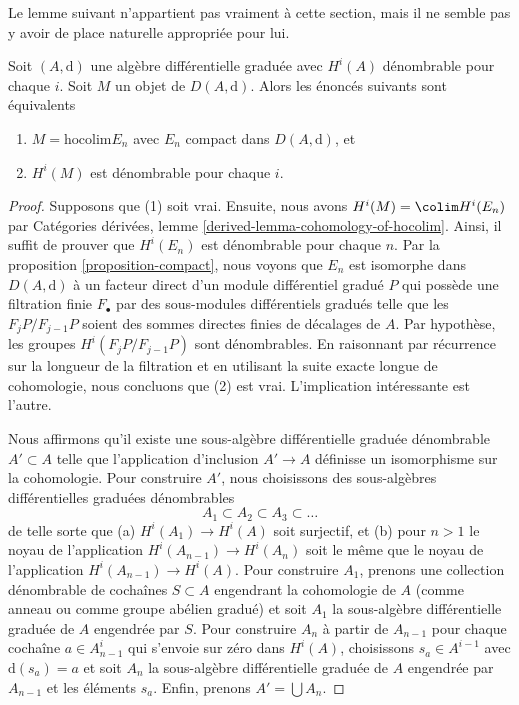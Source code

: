 \noindent
Le lemme suivant n'appartient pas vraiment à cette section, mais il ne
semble pas y avoir de place naturelle appropriée pour lui.

\begin{lemma}
\label{lemma-countable}
Soit $(A, \text{d})$ une algèbre différentielle graduée avec
$H^i(A)$ dénombrable pour chaque $i$. Soit $M$ un objet de $D(A, \text{d})$. Alors
les énoncés suivants sont équivalents
\begin{enumerate}
\item $M = \text{hocolim} E_n$ avec $E_n$ compact dans $D(A, \text{d})$, et
\item $H^i(M)$ est dénombrable pour chaque $i$.
\end{enumerate}
\end{lemma}

\begin{proof}
Supposons que (1) soit vrai. Ensuite, nous avons $H^i(M) = \colim
H^i(E_n)$ par Catégories dérivées, lemme
\ref{derived-lemma-cohomology-of-hocolim}. Ainsi, il suffit de prouver que $H^i(E_n)$ est dénombrable pour chaque $n$.
Par la proposition \ref{proposition-compact}, nous voyons que
$E_n$ est isomorphe dans $D(A, \text{d})$ à un facteur direct d'un
module différentiel gradué $P$ qui possède une filtration finie
$F_\bullet$ par des sous-modules différentiels gradués telle
que les $F_jP/F_{j - 1}P$ soient des sommes directes finies de décalages de $A$.
Par hypothèse, les groupes $H^i(F_jP/F_{j - 1}P)$ sont dénombrables.
En raisonnant par récurrence sur la longueur de la filtration et en
utilisant la suite exacte longue de cohomologie, nous concluons que (2) est
vrai. L'implication intéressante est l'autre.

\medskip\noindent
Nous affirmons qu'il existe une sous-algèbre différentielle
graduée dénombrable $A' \subset A$ telle que l'application d'inclusion
$A' \to A$ définisse un isomorphisme sur la cohomologie. Pour
construire $A'$, nous choisissons des sous-algèbres différentielles graduées
dénombrables
$$
A_1 \subset A_2 \subset A_3 \subset \ldots
$$
de telle sorte que (a) $H^i(A_1) \to H^i(A)$ soit surjectif, et
(b) pour $n > 1$ le noyau de l'application $H^i(A_{n - 1}) \to
H^i(A_n)$ soit le même que le noyau de l'application $H^i(A_{n - 1}) \to
H^i(A)$. Pour construire $A_1$, prenons une collection dénombrable de
cochaînes $S \subset A$ engendrant la cohomologie de $A$ (comme anneau ou
comme groupe abélien gradué) et soit
$A_1$ la sous-algèbre différentielle graduée de $A$ engendrée par $S$. Pour
construire $A_n$ à partir de $A_{n - 1}$ pour chaque cochaîne $a \in A_{n - 1}^i$
qui s'envoie sur zéro dans $H^i(A)$, choisissons $s_a \in A^{i
- 1}$ avec $\text{d}(s_a) = a$ et soit $A_n$ la sous-algèbre
différentielle graduée de $A$ engendrée par $A_{n - 1}$ et les éléments $s_a$. Enfin,
prenons $A' = \bigcup A_n$.


\end{proof}

